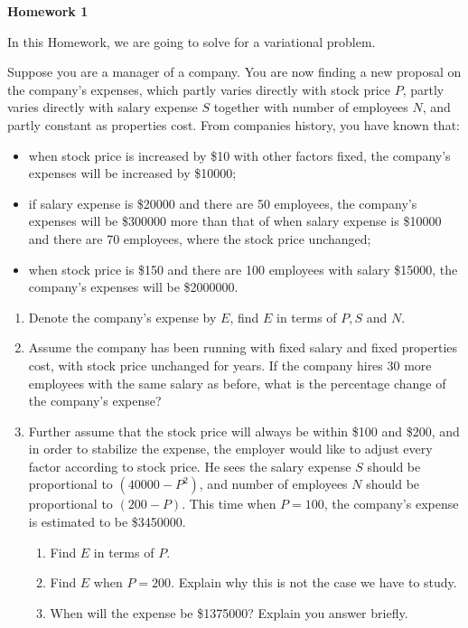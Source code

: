 \documentclass[12pt]{article}
\begin{document}
    \begin{center}
        \textbf{Homework 1}
    \end{center}

    In this Homework, we are going to solve for a variational problem.

    Suppose you are a manager of a company. You are now finding a new proposal on the company's expenses, which partly varies directly with stock price $P$, partly varies directly with salary expense $S$ together with number of employees $N$, and partly constant as properties cost. From companies history, you have known that:\begin{itemize}
        \item when stock price is increased by \$10 with other factors fixed, the company's expenses will be increased by \$10000;
        \item if salary expense is \$20000 and there are 50 employees, the company's expenses will be \$300000 more than that of when salary expense is \$10000 and there are 70 employees, where the stock price unchanged;
        \item when stock price is \$150 and there are 100 employees with salary \$15000, the company's expenses will be \$2000000.
    \end{itemize}

    \begin{enumerate}
        \item Denote the company's expense by $E$, find $E$ in terms of $P,S$ and $N$.
        \item Assume the company has been running with fixed salary and fixed properties cost, with stock price unchanged for years. If the company hires 30 more employees with the same salary as before, what is the percentage change of the company's expense?
        \item Further assume that the stock price will always be within \$100 and \$200, and in order to stabilize the expense, the employer would like to adjust every factor according to stock price. He sees the salary expense $S$ should be proportional to $(40000-P^2)$, and number of employees $N$ should be proportional to $(200-P)$. This time when $P=100$, the company's expense is estimated to be \$3450000.\begin{enumerate}
            \item Find $E$ in terms of $P$.
            \item Find $E$ when $P=200$. Explain why this is not the case we have to study.
            \item When will the expense be \$1375000? Explain you answer briefly.
        \end{enumerate}
    \end{enumerate}
\end{document}
